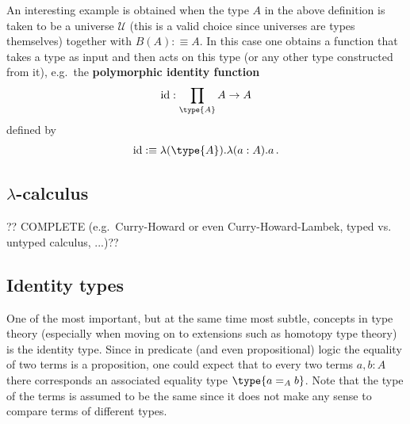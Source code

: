     \begin{example}
        An interesting example is obtained when the type $A$ in the above definition is taken to be a universe $\mathcal{U}$ (this is a valid choice since universes are types themselves) together with $B(A):\equiv A$. In this case one obtains a function that takes a type as input and then acts on this type (or any other type constructed from it), e.g.~the \textbf{polymorphic identity function}
        \begin{gather}
            \mathrm{id}:\prod_{\type{A}}A\rightarrow A
        \end{gather}
        defined by
        \begin{gather}
            \mathrm{id}:\equiv\lambda(\type{A}).\lambda(a:A).a\,.
        \end{gather}
    \end{example}

\subsection{\texorpdfstring{$\lambda$-calculus}{Lambda-calculus}}

    ?? COMPLETE (e.g.~Curry-Howard or even Curry-Howard-Lambek, typed vs. untyped calculus, ...)??

\subsection{Identity types}

    One of the most important, but at the same time most subtle, concepts in type theory (especially when moving on to extensions such as homotopy type theory) is the identity type. Since in predicate (and even propositional) logic the equality of two terms is a proposition, one could expect that to every two terms $a,b:A$ there corresponds an associated equality type $\type{a=_Ab}$. Note that the type of the terms is assumed to be the same since it does not make any sense to compare terms of different types.

